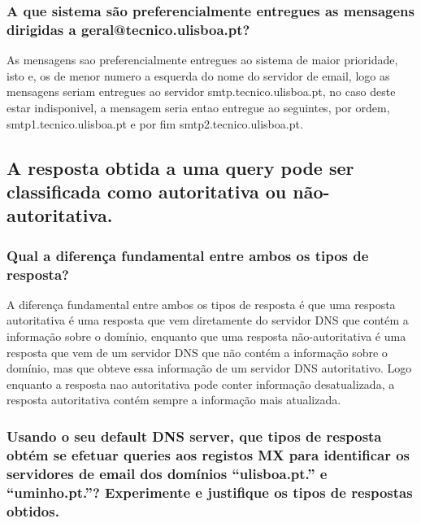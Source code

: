 \documentclass{article}
\begin{document}
\subsubsection{A que sistema são preferencialmente entregues as mensagens dirigidas a
geral@tecnico.ulisboa.pt?}

As mensagens sao preferencialmente entregues ao sistema de maior prioridade, isto e, os de menor numero a esquerda do nome do servidor de email, logo as mensagens seriam entregues ao servidor smtp.tecnico.ulisboa.pt, no caso deste estar indisponivel, a mensagem seria entao entregue ao seguintes, por ordem, smtp1.tecnico.ulisboa.pt e por fim smtp2.tecnico.ulisboa.pt.

\subsection{A resposta obtida a uma query pode ser classificada como autoritativa ou não-autoritativa.}
\subsubsection{Qual a diferença fundamental entre ambos os tipos de resposta?}

A diferença fundamental entre ambos os tipos de resposta é que uma resposta autoritativa é uma resposta que vem diretamente do servidor DNS que contém a informação sobre o domínio, enquanto que uma resposta não-autoritativa é uma resposta que vem de um servidor DNS que não contém a informação sobre o domínio, mas que obteve essa informação de um servidor DNS autoritativo.
Logo enquanto a resposta nao autoritativa pode conter informação desatualizada, a resposta autoritativa contém sempre a informação mais atualizada.

\subsubsection{Usando o seu default DNS server, que tipos de resposta obtém se efetuar queries aos registos
MX para identificar os servidores de email dos domínios “ulisboa.pt.” e “uminho.pt.”?
Experimente e justifique os tipos de respostas obtidos.}

\begin{figure}[h!]
    \centering
    \qquad
\end{figure}
\end{document}
